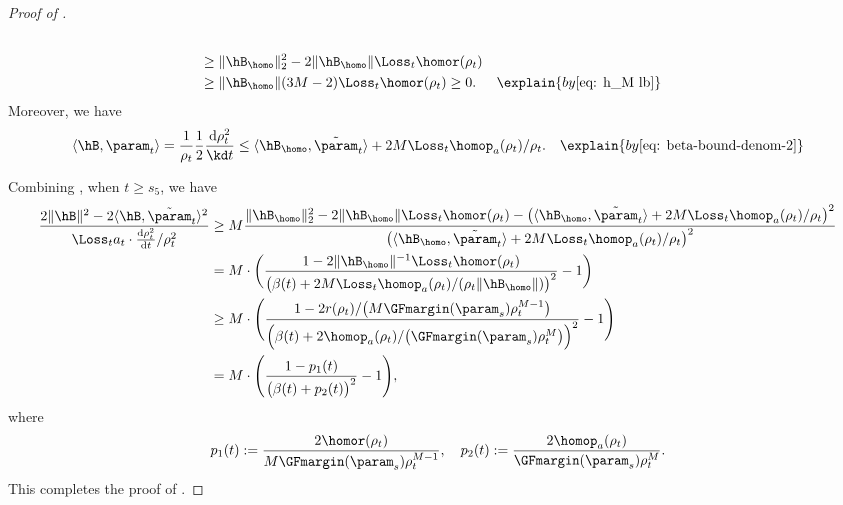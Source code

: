 \begin{proof}[Proof of ]
\begin{align}
\notag \\ 
&\ge \|\hB_{\homo}\|_2^2 - 2\|\hB_{\homo}\| \Loss_t\homor(\rho_t) \\ 
&\ge \|\hB_{\homo}\| ( 3M-2) \Loss_t\homor(\rho_t)  \ge 0. \notag
&&\explain{  by \Cref{eq: h_M lb} }
\end{align}
Moreover, we have 
\begin{align}
\label{eq: beta-bound-num2}
\langle  \hB , \param_t \rangle  
= \frac{1}{\rho_t} \frac{1}{2} \frac{\mathrm{d}  \rho_t^2}{\kd t}
\le  \langle \hB_{\homo},  \tilde \param_t
\rangle + 2M\Loss_t \homop_a(\rho_t) / \rho_t.
&&\explain{ by \Cref{eq: beta-bound-denom-2} } 
\end{align}

Combining , when $t\ge s_5$, we have 
\begin{align*}
    \frac{2\|\hB\|^2  - 2\langle \hB, \tilde{\param}_t \rangle^2 }{\Loss_t a_t \cdot \frac{\mathrm{d}\rho_t^2}{\mathrm{d} t} / \rho_t^2 } &\ge M \frac{\|\hB_{\homo}\|_2^2 - 2\|\hB_{\homo}\| \Loss_t\homor(\rho_t) -\big(\langle \hB_{\homo}, \tilde \param_t \rangle + 2M\Loss_t \homop_a(\rho_t) / \rho_t \big)^2}{\big(\langle \hB_{\homo}, \tilde \param_t \rangle + 2M\Loss_t \homop_a(\rho_t) / \rho_t \big)^2}\\ 
    &= M \cdot \bigg( \frac{1- 2\|\hB_{\homo}\|^{-1} \Loss_t\homor(\rho_t) }{\big(\beta(t) + 2M\Loss_t \homop_a(\rho_t)/(\rho_t \|\hB_{\homo}\|)\big)^2} -1\bigg)\\ 
    & \ge M \cdot \Bigg(\frac{1 - 2r(\rho_t)/ \big(M\GFmargin(\param_s) \rho^{M-1}_t \big)}{\Big( \beta(t) + 2 \homop_a(\rho_t) / \big(\GFmargin(\param_s) \rho^{M}_t \big)  \Big)^2}-1 \Bigg) \\ 
    & = M \cdot \Bigg( \frac{1 - p_1(t)}{\big(\beta(t) + p_2(t) \big)^2}-1\Bigg), 
\end{align*}
where 
\[
    p_1(t) := \frac{2 \homor(\rho_t)}{ M\GFmargin(\param_s) \rho^{M-1}_t}, \quad p_2(t) := \frac{2 \homop_a(\rho_t)}{\GFmargin(\param_s) \rho^{M}_t}.
\]
This completes the proof of .
\end{proof}




